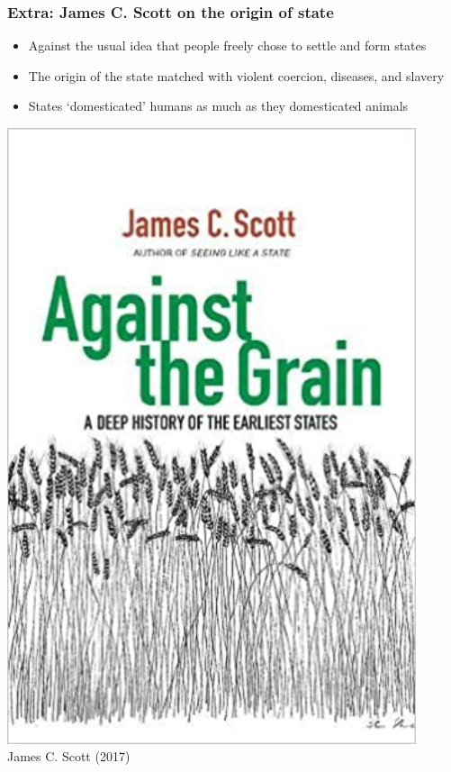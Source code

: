 \documentclass[aspectratio=43, handout]{beamer}
\begin{document}
\begin{frame}
\frametitle{Extra: James C. Scott on the origin of state}
\centering

\begin{minipage}{0.6\textwidth}\centering
  \begin{itemize}
    \item Against the usual idea that people freely chose to settle and form states
    \item The origin of the state matched with violent coercion, diseases, and slavery
    \item States `domesticated' humans as much as they domesticated animals
  \end{itemize}
\end{minipage}\hfill
\begin{minipage}{0.39\textwidth}\centering
  \includegraphics[width = 0.9\textwidth]{img/scott_against}\\
  James C. Scott (2017)
\end{minipage}

\end{frame}
\end{document}
